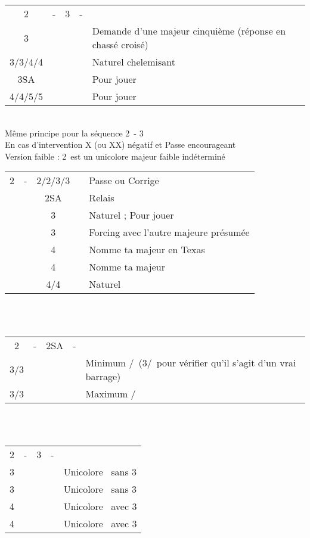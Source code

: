\documentclass[a4paper, oneside, 11pt]{report}
\begin{document}
	\begin{tabular}{cccc|l}
	2\trefle & - & 3\trefle & - &\\
	3\carreau &&&& Demande d'une majeur cinquième (réponse en chassé croisé)\\
	3\coeur/3\pique/4\trefle/4\carreau &&&& Naturel chelemisant\\
	3SA &&&& Pour jouer\\
	4\coeur/4\pique/5\trefle/5\carreau &&&& Pour jouer\\	
	\end{tabular}\\
	Même principe pour la séquence 2\trefle\ - 3\carreau\\

	En cas d'intervention X (ou XX) négatif et Passe encourageant\\	

	Version faible : 2\carreau\ est un unicolore majeur faible indéterminé\\

	\begin{tabular}{cccc|l}
	2\carreau & - & 2\coeur/2\pique/3\coeur/3\pique && Passe ou Corrige\\
	&& 2SA && Relais\\
	&& 3\trefle && Naturel ; Pour jouer\\
	&& 3\carreau && Forcing avec l'autre majeure présumée\\
	&& 4\trefle && Nomme ta majeur en Texas\\
	&& 4\carreau && Nomme ta majeur\\
	&& 4\coeur/4\pique && Naturel\\
	\end{tabular}\\\\

	\begin{tabular}{cccc|l}
	2\carreau & - & 2SA & - &\\
	3\trefle/3\carreau &&&& Minimum \coeur/\pique\ (3\carreau/\coeur\ pour vérifier qu'il s'agit d'un vrai barrage)\\
	3\coeur/3\pique &&&& Maximum \pique/\coeur\\
	\end{tabular}\\\\
	
	\begin{tabular}{cccc|l}
	2\carreau & - & 3\carreau & - &\\
	3\coeur &&&& Unicolore \coeur\ sans 3\pique\\
	3\pique &&&& Unicolore \pique\ sans 3\coeur\\
	4\trefle &&&& Unicolore \coeur\ avec 3\pique\\
	4\carreau &&&& Unicolore \pique\ avec 3\coeur\\
	\end{tabular}\\\\
\end{document}
